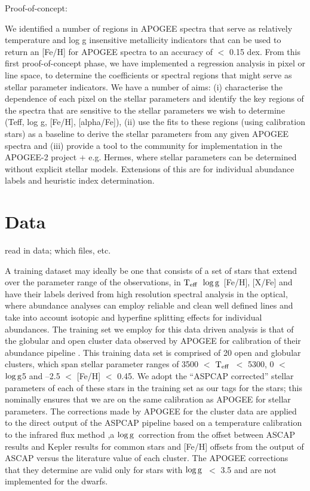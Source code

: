\documentclass[12pt, preprint]{aastex}
\newcommand{\teff}{\mbox{$\rm T_{eff}$}}
\newcommand{\logg}{\mbox{$\rm \log g$}}
\begin{document}
Proof-of-concept: 

We identified a number of regions in APOGEE spectra that serve as relatively temperature and log g insensitive metallicity indicators that can be used to return an [Fe/H] for APOGEE spectra to an accuracy of $<$ 0.15 dex. From this first proof-of-concept phase, we have implemented a regression analysis in pixel or line space, to determine the coefficients or spectral regions that might serve as stellar parameter indicators.  We have a number of aims: (i) characterise the dependence of each pixel on the stellar parameters and identify the key regions of the spectra that are sensitive to the stellar parameters we wish to determine (Teff, log g, [Fe/H], [alpha/Fe]), (ii) use the fits to these regions (using calibration stars) as a baseline to derive the stellar parameters from any given APOGEE spectra and (iii) provide a tool to the community for implementation in the APOGEE-2 project + e.g. Hermes, where stellar parameters can be determined without explicit stellar models. Extensions of this are for individual abundance labels and heuristic index determination.

\section{Data}

read in data; which files, etc.

A training dataset may ideally be one that consists of a set of stars that extend over the parameter range of the observations, in \teff\, \logg\, [Fe/H], [X/Fe] and have their labels derived from high resolution spectral analysis in the optical, where abundance analyses can employ reliable and clean well defined lines and take into account isotopic and hyperfine splitting effects for individual abundances. The training set we employ for this data driven analysis is that of the globular and open cluster data observed by APOGEE for calibration of their abundance pipeline \citep{Mesaroz2013}. This training data set is comprised of 20 open and globular clusters, which span stellar parameter ranges of 3500 $<$ \teff\ $<$ 5300, 0 $<$ \logg 5 and --2.5 $<$ [Fe/H] $<$ 0.45. We adopt the ``ASPCAP corrected'' stellar parameters of each of these stars in the training set as our tags for the stars; this nominally ensures that we are on the same calibration as APOGEE for stellar parameters. The corrections made by APOGEE for the cluster data are applied to the direct output of the ASPCAP pipeline based on a temperature calibration to the infrared flux method \citep{Gonzalez2009} ,a \logg\ correction from the offset between ASCAP results and Kepler results for common stars and [Fe/H] offsets from the output of ASCAP versus the literature value of each cluster.  The APOGEE corrections that they determine are valid only for stars with \logg\ $<$ 3.5 and are not implemented for the dwarfs. 
\end{document}
